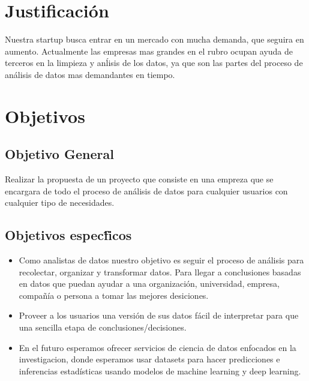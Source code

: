 \documentclass[12pt,a4paper,openright]{article}
\begin{document}
\section{Justificación}


Nuestra startup busca entrar en un mercado con mucha demanda, que seguira en aumento. Actualmente las empresas mas grandes en el rubro ocupan ayuda de terceros en la limpieza y an\'lisis de los datos, ya que son las partes del proceso de an\'alisis de datos mas demandantes en tiempo.








\section{Objetivos}
\subsection{Objetivo General}
Realizar la propuesta de un proyecto que consiste en una empreza que se encargara de todo el proceso de an\'alisis de datos para cualquier usuarios con cualquier tipo de necesidades.

\subsection{Objetivos espec\'ficos}
\begin{itemize}
    \item Como analistas de datos nuestro objetivo es seguir el proceso de an\'alisis para recolectar, organizar y transformar datos. Para llegar a conclusiones basadas en datos que puedan ayudar a una organizaci\'on, universidad, empresa, compañ\'ia o persona a tomar las mejores desiciones.
    \item Proveer a los usuarios una versi\'on de sus datos f\'acil de interpretar para que una sencilla etapa de conclusiones/decisiones.
    \item En el futuro esperamos ofrecer servicios de ciencia de datos enfocados en la investigacion, donde esperamos usar datasets para hacer predicciones e inferencias estad\'isticas usando modelos de machine learning y deep learning.

\end{itemize}
\end{document}
